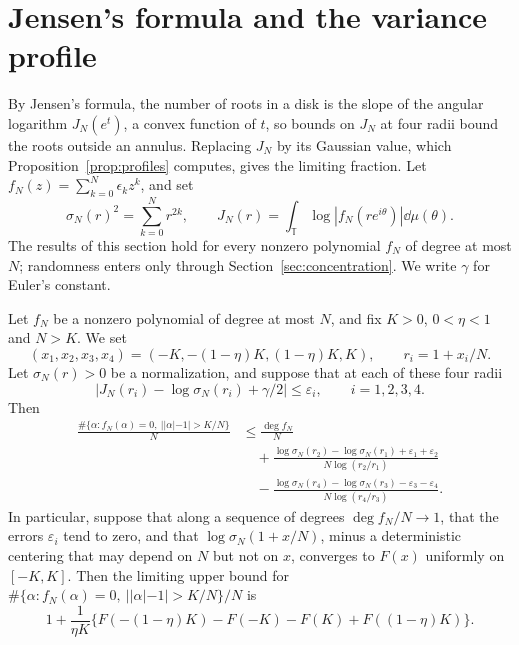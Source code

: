 \section{Jensen's formula and the variance profile}\label{sec:radial}

By Jensen's formula, the number of roots in a disk is the slope of the
angular logarithm $J_N(e^t)$, a convex function of $t$, so bounds on
$J_N$ at four radii bound the roots outside an annulus. Replacing $J_N$
by its Gaussian value, which Proposition~\ref{prop:profiles} computes,
gives the limiting fraction. Let $f_N(z)=\sum_{k=0}^N\epsilon_kz^k$, and
set
\[
 \sigma_N(r)^2=\sum_{k=0}^Nr^{2k},\qquad
 J_N(r)=\int_{\mathbb T}\log|f_N(re^{i\theta})|\dd\mu(\theta).
\]
The results of this section hold for every nonzero polynomial $f_N$ of
degree at most $N$; randomness enters only through
Section~\ref{sec:concentration}. We write $\gamma$ for Euler's constant.

\begin{lemma}\label{thm:T2}
Let $f_N$ be a nonzero polynomial of degree at most $N$, and fix $K>0$,
$0<\eta<1$ and $N>K$. We set
\[
 (x_1,x_2,x_3,x_4)=(-K,-(1-\eta)K,(1-\eta)K,K),\qquad r_i=1+x_i/N.
\]
Let $\sigma_N(r)>0$ be a normalization, and suppose that at each of these
four radii
\begin{equation}
 \left|J_N(r_i)-\log\sigma_N(r_i)+\gamma/2\right|\leq\varepsilon_i,
 \qquad i=1,2,3,4. \label{eq:four-radius-log-errors}
\end{equation}
Then
\begin{align}
 \frac{\#\{\alpha:f_N(\alpha)=0,\ ||\alpha|-1|>K/N\}}N
 &\leq\frac{\deg f_N}N\nonumber\\
 &\quad+\frac{\log\sigma_N(r_2)-\log\sigma_N(r_1)+\varepsilon_1+\varepsilon_2}{N\log(r_2/r_1)}\nonumber\\
 &\quad-\frac{\log\sigma_N(r_4)-\log\sigma_N(r_3)-\varepsilon_3-\varepsilon_4}{N\log(r_4/r_3)}.\label{eq:T2-exact}
\end{align}
In particular, suppose that along a sequence of degrees $\deg f_N/N\to1$, that
the errors $\varepsilon_i$ tend to zero, and that $\log\sigma_N(1+x/N)$,
minus a deterministic centering that may depend on $N$ but not on $x$,
converges to $F(x)$ uniformly on $[-K,K]$.
Then the limiting upper bound for
$\#\{\alpha:f_N(\alpha)=0,\ ||\alpha|-1|>K/N\}/N$ is
\begin{equation}
 1+\frac1{\eta K}\{F(-(1-\eta)K)-F(-K)-F(K)+F((1-\eta)K)\}. \label{eq:T2-limit}
\end{equation}
\end{lemma}


